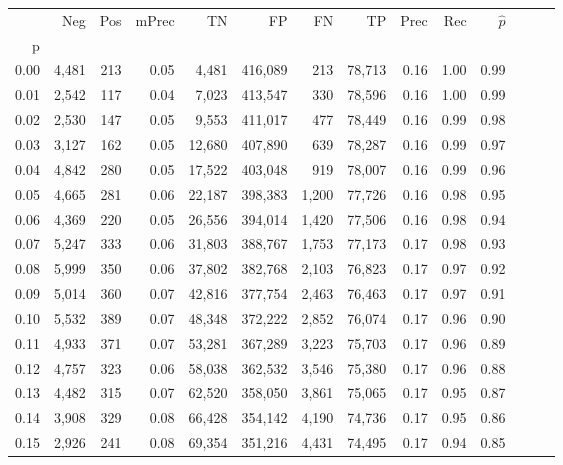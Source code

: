 \begin{tabular}{rrrrrrrrrrrrrr}
\toprule
{} &    Neg &    Pos & mPrec &       TN &       FP &      FN &      TP &  Prec &   Rec & $\hat{p}$ \\
p    &        &        &       &          &          &         &         &       &       &           \\
\midrule
0.00 &  4,481 &    213 &  0.05 &    4,481 &  416,089 &     213 &  78,713 &  0.16 &  1.00 &      0.99 \\
0.01 &  2,542 &    117 &  0.04 &    7,023 &  413,547 &     330 &  78,596 &  0.16 &  1.00 &      0.99 \\
0.02 &  2,530 &    147 &  0.05 &    9,553 &  411,017 &     477 &  78,449 &  0.16 &  0.99 &      0.98 \\
0.03 &  3,127 &    162 &  0.05 &   12,680 &  407,890 &     639 &  78,287 &  0.16 &  0.99 &      0.97 \\
0.04 &  4,842 &    280 &  0.05 &   17,522 &  403,048 &     919 &  78,007 &  0.16 &  0.99 &      0.96 \\
0.05 &  4,665 &    281 &  0.06 &   22,187 &  398,383 &   1,200 &  77,726 &  0.16 &  0.98 &      0.95 \\
0.06 &  4,369 &    220 &  0.05 &   26,556 &  394,014 &   1,420 &  77,506 &  0.16 &  0.98 &      0.94 \\
0.07 &  5,247 &    333 &  0.06 &   31,803 &  388,767 &   1,753 &  77,173 &  0.17 &  0.98 &      0.93 \\
0.08 &  5,999 &    350 &  0.06 &   37,802 &  382,768 &   2,103 &  76,823 &  0.17 &  0.97 &      0.92 \\
0.09 &  5,014 &    360 &  0.07 &   42,816 &  377,754 &   2,463 &  76,463 &  0.17 &  0.97 &      0.91 \\
0.10 &  5,532 &    389 &  0.07 &   48,348 &  372,222 &   2,852 &  76,074 &  0.17 &  0.96 &      0.90 \\
0.11 &  4,933 &    371 &  0.07 &   53,281 &  367,289 &   3,223 &  75,703 &  0.17 &  0.96 &      0.89 \\
0.12 &  4,757 &    323 &  0.06 &   58,038 &  362,532 &   3,546 &  75,380 &  0.17 &  0.96 &      0.88 \\
0.13 &  4,482 &    315 &  0.07 &   62,520 &  358,050 &   3,861 &  75,065 &  0.17 &  0.95 &      0.87 \\
0.14 &  3,908 &    329 &  0.08 &   66,428 &  354,142 &   4,190 &  74,736 &  0.17 &  0.95 &      0.86 \\
0.15 &  2,926 &    241 &  0.08 &   69,354 &  351,216 &   4,431 &  74,495 &  0.17 &  0.94 &      0.85 \\

\end{tabular}
